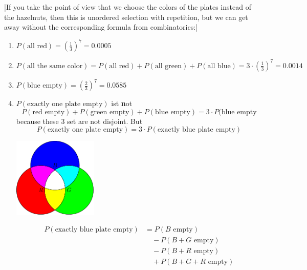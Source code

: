 \documentclass[twoside,11pt,a4paper]{article}
\newif\ifEN \ENtrue	                %
\def\tr|#1|#2|{\ifEN #2\else #1\fi}     %
\theoremstyle{definition}
\begin{document}
\begin{xxwrap}
\begin{Answer}
     |If you take the point of view that we choose the colors of the plates instead of the hazelnuts,
     then this is unordered selection with repetition, but we can get away without the corresponding
     formula from combinatorics:|
  \begin{enumerate}
  \item $P(\text{\tr|alle rot|all red|})=\left(\frac13\right)^7= 0.0005$
  \item $P(\text{\tr|alle die gleiche Farbe|all the same color|})
         =P(\text{\tr|alle rot|all red|})+
         P(\text{\tr|alle grün|all green|})+
         P(\text{\tr|alle blau|all blue|})
         = 3\cdot\left(\frac13\right)^7=0.0014$
  \item $P(\text{\tr|blau leer|blue empty|})=\left(\frac23\right)^7= 0.0585$
  \item $P(\text{\tr|genau ein T. leer|exactly one plate empty|})$ \tr|ist \textbf{nicht} |ist \textbf{not} |
      $$P(\text{\tr|rot leer|red empty|})+P(\text{\tr|grün leer|green empty|})+P(\text{\tr|blau leer|blue empty|})=3\cdot P(\text{\tr|blau leer|blue empty|}$$
     \tr|weil die 3 entprechenden Mengen nicht diskjunkt sind. Aber |because these 3 set are not disjoint. But  |
      $$
      P(\text{\tr|genau ein T. leer|exactly one plate empty|})=3\cdot P(\text{\tr|genau blau leer|exactly blue plate empty|})
      $$   
      \begin{center}
      \includegraphics[width=4cm]{images/probability/plates.pdf}
    \end{center}
      \begin{align*}
        P(\text{\tr|genau blau leer|exactly blue plate empty|})&=P(\text{$B$ \tr|leer|empty|})\\ 
                                                               &\quad- P(\text{$B+G$ \tr|leer|empty|})\\
                                                               &\quad- P(\text{$B+R$ \tr|leer|empty|})\\
                                                               &\quad+P(\text{$B+G+R$ \tr|leer|empty|})\\

\end{align*}
\end{enumerate}
\end{Answer}
\end{xxwrap}
\end{document}
